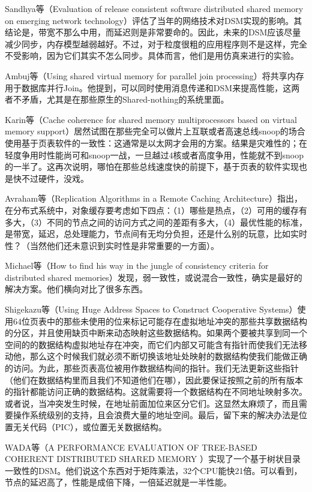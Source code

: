 \documentclass[a4paper,twoside]{scrbook}
\begin{document}
Sandhya等（Evaluation of release consistent software distributed shared memory on emerging network technology）评估了当年的网络技术对DSM实现的影响。其结论是，带宽不那么中用，而延迟则是非常要命的。因此，未来的DSM应该尽量减少同步，内存模型越弱越好。不过，对于粒度很粗的应用程序则不是这样，完全不受影响，因为它们其实不怎么同步。具体而言，他们是用仿真来进行的实验。

Ambuj等（Using shared virtual memory for parallel join processing）将共享内存用于数据库并行Join。他提到，可以同时使用消息传递和DSM来提高性能，这两者不矛盾，尤其是在那些原生的Shared-nothing的系统里面。

Karin等（Cache coherence for shared memory multiprocessors based on virtual memory support）居然试图在那些完全可以做片上互联或者高速总线snoop的场合使用基于页表软件的一致性：这通常是以太网才会用的方案。结果是灾难性的；在轻度争用时性能尚可和snoop一战，一旦越过4核或者高度争用，性能就不到snoop的一半了。这再次说明，哪怕在那些总线速度快的前提下，基于页表的软件实现也是快不过硬件，没戏。

Avraham等（Replication Algorithms in a Remote Caching Architecture）指出，在分布式系统中，对象缓存要考虑如下四点：（1）哪些是热点，（2）可用的缓存有多大，（3）不同的节点之间的访问方式之间的差距有多大，（4）最优性能的标准，是带宽，延迟，总处理能力，节点间有无均分负担，还是什么别的玩意，比如实时性？（当然他们还未意识到实时性是非常重要的一方面）。

Michael等（How to find his way in the jungle of consistency criteria for distributed shared memories）发现，弱一致性，或说混合一致性，确实是最好的解决方案。他们横向对比了很多东西。

Shigekazu等（Using Huge Address Spaces to Construct Cooperative Systems）使用64位页表中的那些未使用的位来标记可能存在虚拟地址冲突的那些共享数据结构的分区，并且使用缺页中断来动态映射这些数据结构。如果两个要被共享到同一个空间的的数据结构虚拟地址存在冲突，而它们内部又可能含有指针而使我们无法移动他，那么这个时候我们就必须不断切换该地址处映射的数据结构使我们能做正确的访问。为此，那些页表高位被用作数据结构间的指针。我们无法更新这些指针（他们在数据结构里而且我们不知道他们在哪），因此要保证按照之前的所有版本的指针都能访问正确的数据结构。这就需要将一个数据结构在不同地址映射多次。或者说，当冲突发生时候，在地址前面加位来区分它们。这显然太麻烦了，而且需要操作系统级别的支持，且会浪费大量的地址空间。最后，留下来的解决办法是位置无关代码（PIC），或位置无关数据结构。

WADA等（A PERFORMANCE EVALUATION OF TREE-BASED COHERENT DISTRIBUTED SHARED MEMORY ）实现了一个基于树状目录一致性的DSM。他们说这个东西对于矩阵乘法，32个CPU能快21倍。可以看到，节点的延迟高了，性能是成倍下降，一倍延迟就是一半性能。
\end{document}
